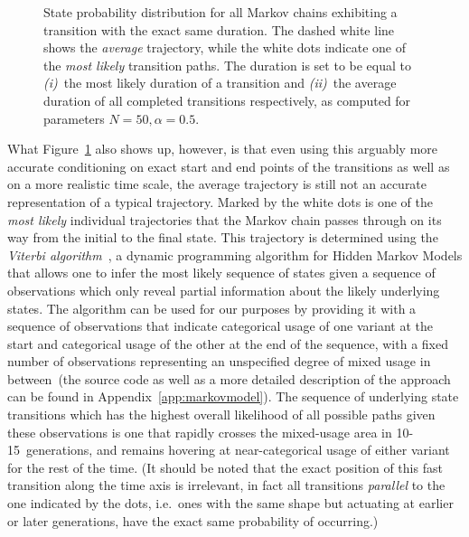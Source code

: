 \begin{figure}[htbp]

{\centering {}

}

\caption[State probability distribution for all Markov chains exhibiting a transition with the exact same duration.]{State probability distribution for all Markov chains exhibiting a transition with the exact same duration. The dashed white line shows the \emph{average} trajectory, while the white dots indicate one of the \emph{most likely} transition paths. The duration is set to be equal to \textit{(i)}~the most likely duration of a transition and \textit{(ii)}~the average duration of all completed transitions respectively, as computed for parameters $N=50, \alpha=0.5$.}\label{fig:doubleconditioned}
\end{figure}



What Figure~\ref{fig:doubleconditioned} also shows up, however, is that even using this arguably more accurate conditioning on exact start and end points of the transitions as well as on a more realistic time scale, the average trajectory is still not an accurate representation of a typical trajectory. Marked by the white dots is one of the \emph{most likely} individual trajectories that the Markov chain passes through on its way from the initial to the final state. This trajectory is determined using the \emph{Viterbi algorithm}~\citep{Jurafsky2008}, a dynamic programming algorithm for Hidden Markov Models that allows one to infer the most likely sequence of states given a sequence of observations which only reveal partial information about the likely underlying states. The algorithm can be used for our purposes by providing it with a sequence of observations that indicate categorical usage of one variant at the start and categorical usage of the other at the end of the sequence, with a fixed number of observations representing an unspecified degree of mixed usage in between~(the source code as well as a more detailed description of the approach can be found in Appendix~\ref{app:markovmodel}).
The sequence of underlying state transitions which has the highest overall likelihood of all possible paths given these observations is one that rapidly crosses the mixed-usage area in 10-15~generations, and remains hovering at near-categorical usage of either variant for the rest of the time. (It should be noted that the exact position of this fast transition along the time axis is irrelevant, in fact all transitions \emph{parallel} to the one indicated by the dots, i.e.~ones with the same shape but actuating at earlier or later generations, have the exact same probability of occurring.)

